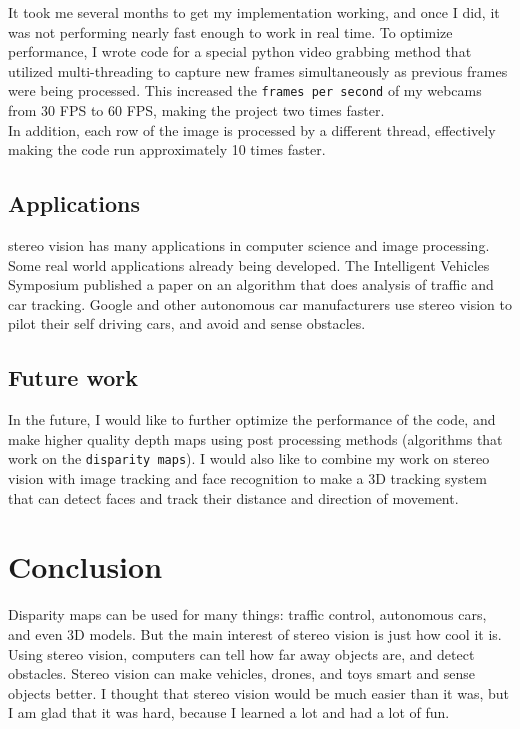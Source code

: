 \documentclass[11pt,fleqn]{article}
\begin{document}
It took me several months to get my implementation working, and once I did, it was not performing nearly fast enough to work in real time. To optimize performance, I wrote code for a special python video grabbing method that utilized multi-threading to capture new frames simultaneously as previous frames were being processed. This increased the \texttt{frames per second} of my webcams from 30 FPS to 60 FPS, making the project two times faster.\\[5pt]
%
In addition, each row of the image is processed by a different thread, effectively making the code run approximately 10 times faster.

\subsection{Applications}

stereo vision has many applications in computer science and image processing. Some real world applications already being developed. The Intelligent Vehicles Symposium published a paper on an algorithm that does analysis of traffic and car tracking. Google and other autonomous car manufacturers use stereo vision to pilot their self driving cars, and avoid and sense obstacles.

\subsection{Future work}

In the future, I would like to further optimize the performance of the code, and  make higher quality depth maps using post processing methods (algorithms that work on the \texttt{disparity maps}). I would also like to combine my work on stereo vision with image tracking and face recognition to make a 3D tracking system that can detect faces and track their distance and direction of movement.


\section{Conclusion}

Disparity maps can be used for many things: traffic control, autonomous cars, and even 3D models. But the main interest of stereo vision is just how cool it is. Using stereo vision, computers can tell how far away objects are, and detect obstacles. Stereo vision can make vehicles, drones, and toys smart and sense objects better. I thought that stereo vision would be much easier than it was, but I am glad that it was hard, because I learned a lot and had a lot of fun.
\end{document}
